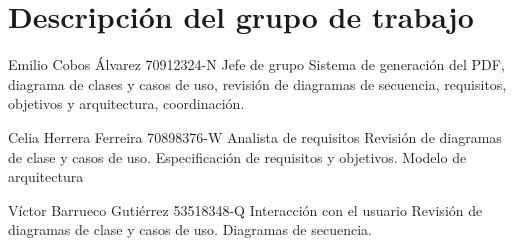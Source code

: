 \section{Descripción del grupo de trabajo}

\staff
{Emilio Cobos Álvarez}
{70912324-N}
{Jefe de grupo}
{Sistema de generación del PDF, diagrama de clases y casos de uso, revisión de diagramas de secuencia, requisitos, objetivos y arquitectura, coordinación.}

\staff
{Celia Herrera Ferreira}
{70898376-W}
{Analista de requisitos}
{Revisión de diagramas de clase y casos de uso. Especificación de requisitos y objetivos. Modelo de arquitectura}

\staff
{Víctor Barrueco Gutiérrez}
{53518348-Q}
{Interacción con el usuario}
{Revisión de diagramas de clase y casos de uso. Diagramas de secuencia.}

